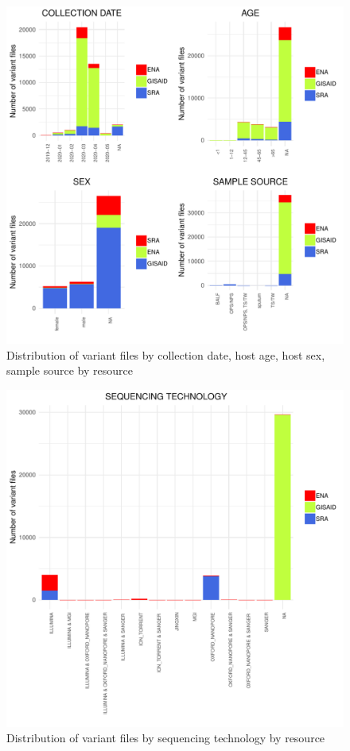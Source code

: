 \documentclass[a4paper, 10pt]{article}        %
\begin{document}
   \begin{figure}[!htb]
     \centering
       \includegraphics[width=1\textwidth]{all_grid.pdf}
     \caption{Distribution of variant files by collection date, host age, host sex, sample source by resource}
     \label{fig:illu}
 \end{figure}




 
   \begin{figure}[!htb]
     \centering
       \includegraphics[width=1\textwidth]{all_plat_res.pdf}
     \caption{Distribution of variant files by sequencing technology by resource}
     \label{fig:illu}
 \end{figure}

 

 
 
\end{document}
